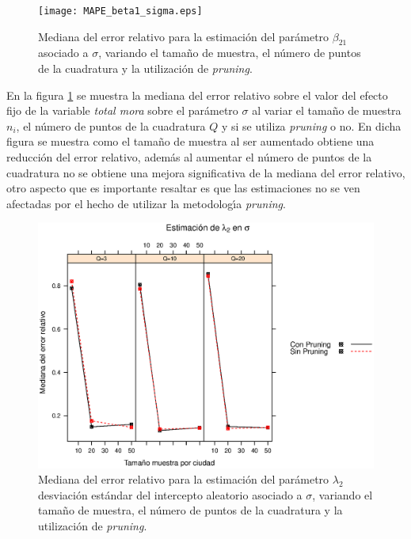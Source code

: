\begin{figure}
	\begin{center}
		\texttt{[image: MAPE\_beta1\_sigma.eps]}	
		\caption{Mediana del error relativo para la estimaci\'{o}n del par\'{a}metro $\beta_{21}$ asociado a $\sigma$, variando el tama\~{n}o de muestra, el n\'{u}mero de puntos de la cuadratura y  la utilizaci\'{o}n de \textit{pruning}.}
		\label{MAPE_beta1_sigma}
	\end{center}
\end{figure}

En la figura \ref{MAPE_beta1_sigma} se muestra la mediana del error relativo sobre el valor del efecto fijo de la variable \textsl{total mora} sobre el par\'{a}metro $\sigma$ al variar el tama\~{n}o de muestra $n_i$, el n\'{u}mero de puntos de la cuadratura $Q$ y si se utiliza \textit{pruning} o no. En dicha figura se muestra como el tama\~{n}o de muestra al ser aumentado obtiene una reducci\'{o}n del error relativo, adem\'{a}s al aumentar el n\'{u}mero de puntos de la cuadratura no se obtiene una mejora significativa de la mediana del error relativo, otro aspecto que es importante resaltar es que las estimaciones no se ven afectadas por el hecho de utilizar la metodolog\'{\i}a \textit{pruning}.\\


\begin{figure}
	\begin{center}
		\includegraphics[scale=0.6]{MAPE_lambda2_sigma.eps}	
		\caption{Mediana del error relativo para la estimaci\'{o}n del par\'{a}metro $\lambda_2$ desviaci\'{o}n est\'{a}ndar del intercepto aleatorio asociado a $\sigma$, variando el tama\~{n}o de muestra, el n\'{u}mero de puntos de la cuadratura y la utilizaci\'{o}n de \textit{pruning}.}
		\label{MAPE_lambda2_sigma}
	\end{center}
\end{figure}

